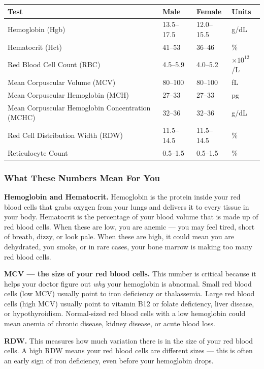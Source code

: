 \begin{longtable}{@{}llll@{}}
\toprule
\textbf{Test} & \textbf{Male} & \textbf{Female} & \textbf{Units} \\
\midrule
\endhead
Hemoglobin (Hgb) & 13.5--17.5 & 12.0--15.5 & g/dL \\
Hematocrit (Hct) & 41--53 & 36--46 & \% \\
Red Blood Cell Count (RBC) & 4.5--5.9 & 4.0--5.2 & $\times 10^{12}$/L \\
Mean Corpuscular Volume (MCV) & 80--100 & 80--100 & fL \\
Mean Corpuscular Hemoglobin (MCH) & 27--33 & 27--33 & pg \\
Mean Corpuscular Hemoglobin Concentration (MCHC) & 32--36 & 32--36 & g/dL \\
Red Cell Distribution Width (RDW) & 11.5--14.5 & 11.5--14.5 & \% \\
Reticulocyte Count & 0.5--1.5 & 0.5--1.5 & \% \\
\bottomrule
\end{longtable}

\subsubsection{What These Numbers Mean For You}

\textbf{Hemoglobin and Hematocrit.} Hemoglobin is the protein inside your red blood cells that grabs oxygen from your lungs and delivers it to every tissue in your body. Hematocrit is the percentage of your blood volume that is made up of red blood cells. When these are low, you are anemic --- you may feel tired, short of breath, dizzy, or look pale. When these are high, it could mean you are dehydrated, you smoke, or in rare cases, your bone marrow is making too many red blood cells.

\textbf{MCV --- the size of your red blood cells.} This number is critical because it helps your doctor figure out \emph{why} your hemoglobin is abnormal. Small red blood cells (low MCV) usually point to iron deficiency or thalassemia. Large red blood cells (high MCV) usually point to vitamin B12 or folate deficiency, liver disease, or hypothyroidism. Normal-sized red blood cells with a low hemoglobin could mean anemia of chronic disease, kidney disease, or acute blood loss.

\textbf{RDW.} This measures how much variation there is in the size of your red blood cells. A high RDW means your red blood cells are different sizes --- this is often an early sign of iron deficiency, even before your hemoglobin drops.

